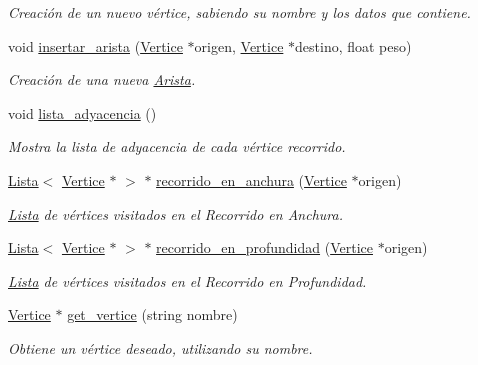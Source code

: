 \begin{DoxyCompactItemize}
\begin{DoxyCompactList}\small\item\em Creación de un nuevo vértice, sabiendo su nombre y los datos que contiene. \end{DoxyCompactList}\item 
void \hyperlink{classGrafo_ae49d7c6c60a6b5bb1a7e66ef72144d36}{insertar\+\_\+arista} (\hyperlink{classVertice}{Vertice} $\ast$origen, \hyperlink{classVertice}{Vertice} $\ast$destino, float peso)
\begin{DoxyCompactList}\small\item\em Creación de una nueva \hyperlink{classArista}{Arista}. \end{DoxyCompactList}\item 
\mbox{\label{classGrafo_a3d18ac8c9af95b06e7e17671b4d17b3c}} 
void \hyperlink{classGrafo_a3d18ac8c9af95b06e7e17671b4d17b3c}{lista\+\_\+adyacencia} ()
\begin{DoxyCompactList}\small\item\em Mostra la lista de adyacencia de cada vértice recorrido. \end{DoxyCompactList}\item 
\hyperlink{classLista}{Lista}$<$ \hyperlink{classVertice}{Vertice} $\ast$ $>$ $\ast$ \hyperlink{classGrafo_a1c65e0f7cbbf74cd690b5eddf220728d}{recorrido\+\_\+en\+\_\+anchura} (\hyperlink{classVertice}{Vertice} $\ast$origen)
\begin{DoxyCompactList}\small\item\em \hyperlink{classLista}{Lista} de vértices visitados en el Recorrido en Anchura. \end{DoxyCompactList}\item 
\hyperlink{classLista}{Lista}$<$ \hyperlink{classVertice}{Vertice} $\ast$ $>$ $\ast$ \hyperlink{classGrafo_ae2773db77afaab3b02a8237b93091818}{recorrido\+\_\+en\+\_\+profundidad} (\hyperlink{classVertice}{Vertice} $\ast$origen)
\begin{DoxyCompactList}\small\item\em \hyperlink{classLista}{Lista} de vértices visitados en el Recorrido en Profundidad. \end{DoxyCompactList}\item 
\hyperlink{classVertice}{Vertice} $\ast$ \hyperlink{classGrafo_ac088cffbe30ed4c895ac831233251d99}{get\+\_\+vertice} (string nombre)
\begin{DoxyCompactList}\small\item\em Obtiene un vértice deseado, utilizando su nombre. \end{DoxyCompactList}\item 

\end{DoxyCompactItemize}
